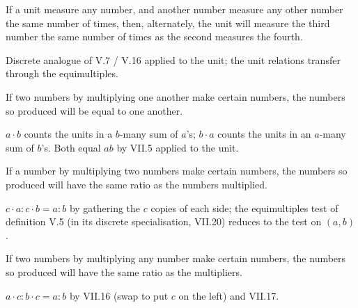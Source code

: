 \documentclass{rrxiv}
\begin{document}
\begin{claim}
\label{prop:VII.15}
If a unit measure any number, and another number measure any other
number the same number of times, then, alternately, the unit will
measure the third number the same number of times as the second
measures the fourth.
\end{claim}
\begin{evidence}
\label{ev:VII.15}
Discrete analogue of V.7 / V.16 applied to the unit; the unit
relations transfer through the equimultiples.
\end{evidence}

\begin{claim}
\label{prop:VII.16}
If two numbers by multiplying one another make certain numbers, the
numbers so produced will be equal to one another.
\end{claim}
\begin{evidence}
\label{ev:VII.16}
$a \cdot b$ counts the units in a $b$-many sum of $a$'s; $b \cdot a$
counts the units in an $a$-many sum of $b$'s.  Both equal $ab$ by
VII.5 applied to the unit.
\end{evidence}

\begin{claim}
\label{prop:VII.17}
If a number by multiplying two numbers make certain numbers, the
numbers so produced will have the same ratio as the numbers
multiplied.
\end{claim}
\begin{evidence}
\label{ev:VII.17}
$c \cdot a : c \cdot b = a : b$ by gathering the $c$ copies of each
side; the equimultiples test of definition V.5 (in its discrete
specialisation, VII.20) reduces to the test on $(a, b)$.
\end{evidence}

\begin{claim}
\label{prop:VII.18}
If two numbers by multiplying any number make certain numbers, the
numbers so produced will have the same ratio as the multipliers.
\end{claim}
\begin{evidence}
\label{ev:VII.18}
$a \cdot c : b \cdot c = a : b$ by VII.16 (swap to put $c$ on the
left) and VII.17.
\end{evidence}
\end{document}
